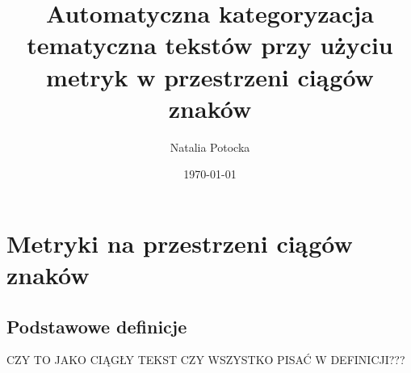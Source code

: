\documentclass{praca1}
\author{Natalia Potocka}
\title{Automatyczna kategoryzacja tematyczna tekstów przy użyciu metryk w przestrzeni ciągów znaków}
\date{\today}
\begin{document}


%

\chapter{Metryki na przestrzeni ciągów znaków}\label{metryki-na-przestrzeni-ciagow-znakow}

\section{Podstawowe definicje}

CZY TO JAKO CIĄGŁY TEKST CZY WSZYSTKO PISAĆ W DEFINICJI???
\end{document}
